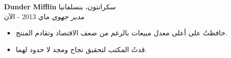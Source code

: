 \foreignlanguage{english}{\textbf{Dunder Mifflin}} \hfill سكرانتون، بنسلفانيا\\
\textit{مدير جهوي} \hfill ماي 2013 - الآن\\
\vspace*{-4pt}
\begin{itemize} \itemsep 1pt
	\item حافظتُ على أعلى معدل مبيعات بالرغم من ضعف الاقتصاد وتقادم المنتج.
	\item قدتُ المكتب لتحقيق نجاح ومجد لا حدود لهما.
\end{itemize}